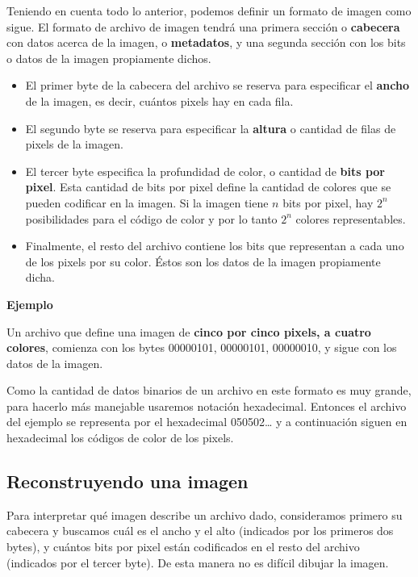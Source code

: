 \documentclass[spanish,a4paper,]{article}
\providecommand{\tightlist}{%
  \setlength{\itemsep}{0pt}\setlength{\parskip}{0pt}}
\begin{document}
Teniendo en cuenta todo lo anterior, podemos definir un formato de
imagen como sigue. El formato de archivo de imagen tendrá una primera
sección o \textbf{cabecera} con datos acerca de la imagen, o
\textbf{metadatos}, y una segunda sección con los bits o datos de la
imagen propiamente dichos.

\begin{itemize}
\tightlist
\item
  El primer byte de la cabecera del archivo se reserva para especificar
  el \textbf{ancho} de la imagen, es decir, cuántos pixels hay en cada
  fila.
\item
  El segundo byte se reserva para especificar la \textbf{altura} o
  cantidad de filas de pixels de la imagen.
\item
  El tercer byte especifica la profundidad de color, o cantidad de
  \textbf{bits por pixel}. Esta cantidad de bits por pixel define la
  cantidad de colores que se pueden codificar en la imagen. Si la imagen
  tiene \(n\) bits por pixel, hay \(2^n\) posibilidades para el código
  de color y por lo tanto \(2^n\) colores representables.
\item
  Finalmente, el resto del archivo contiene los bits que representan a
  cada uno de los pixels por su color. Éstos son los datos de la imagen
  propiamente dicha.
\end{itemize}

\textbf{Ejemplo}

Un archivo que define una imagen de \textbf{cinco por cinco pixels, a
cuatro colores}, comienza con los bytes 00000101, 00000101, 00000010, y
sigue con los datos de la imagen.

Como la cantidad de datos binarios de un archivo en este formato es muy
grande, para hacerlo más manejable usaremos notación hexadecimal.
Entonces el archivo del ejemplo se representa por el hexadecimal
050502\ldots{} y a continuación siguen en hexadecimal los códigos de
color de los pixels.

\hypertarget{reconstruyendo-una-imagen}{%
\subsection{Reconstruyendo una imagen}\label{reconstruyendo-una-imagen}}

Para interpretar qué imagen describe un archivo dado, consideramos
primero su cabecera y buscamos cuál es el ancho y el alto (indicados por
los primeros dos bytes), y cuántos bits por pixel están codificados en
el resto del archivo (indicados por el tercer byte). De esta manera no
es difícil dibujar la imagen.
\end{document}
